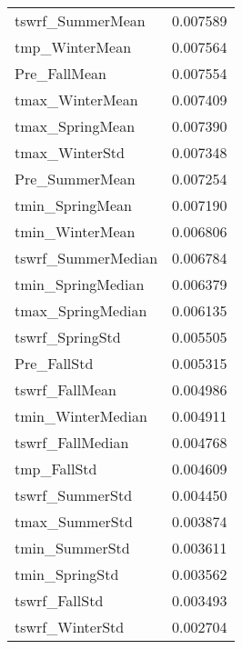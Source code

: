 \begin{tabular}{lr}
tswrf_SummerMean & 0.007589 \\
tmp_WinterMean & 0.007564 \\
Pre_FallMean & 0.007554 \\
tmax_WinterMean & 0.007409 \\
tmax_SpringMean & 0.007390 \\
tmax_WinterStd & 0.007348 \\
Pre_SummerMean & 0.007254 \\
tmin_SpringMean & 0.007190 \\
tmin_WinterMean & 0.006806 \\
tswrf_SummerMedian & 0.006784 \\
tmin_SpringMedian & 0.006379 \\
tmax_SpringMedian & 0.006135 \\
tswrf_SpringStd & 0.005505 \\
Pre_FallStd & 0.005315 \\
tswrf_FallMean & 0.004986 \\
tmin_WinterMedian & 0.004911 \\
tswrf_FallMedian & 0.004768 \\
tmp_FallStd & 0.004609 \\
tswrf_SummerStd & 0.004450 \\
tmax_SummerStd & 0.003874 \\
tmin_SummerStd & 0.003611 \\
tmin_SpringStd & 0.003562 \\
tswrf_FallStd & 0.003493 \\
tswrf_WinterStd & 0.002704 \\
\bottomrule
\end{tabular}
